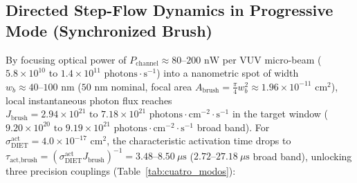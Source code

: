 \documentclass[10pt,twocolumn,a4paper]{article}
\begin{document}
\subsection{Directed Step-Flow Dynamics in Progressive Mode (Synchronized Brush)}
By focusing optical power of $P_{\text{channel}} \approx 80\text{--}200\text{ nW}$ per VUV micro-beam ($5.8 \times 10^{10}$ to $1.4 \times 10^{11}\text{ photons}\cdot\text{s}^{-1}$) into a nanometric spot of width $w_b \approx 40\text{--}100\text{ nm}$ ($50\text{ nm}$ nominal, focal area $A_{\text{brush}} = \frac{\pi}{4}w_b^2 \approx 1.96 \times 10^{-11}\text{ cm}^2$), local instantaneous photon flux reaches $J_{\text{brush}} = 2.94 \times 10^{21}\text{ to }7.18 \times 10^{21}\text{ photons}\cdot\text{cm}^{-2}\cdot\text{s}^{-1}$ in the target window ($9.20 \times 10^{20}\text{ to }9.19 \times 10^{21}\text{ photons}\cdot\text{cm}^{-2}\cdot\text{s}^{-1}$ broad band). For $\sigma_{\text{DIET}}^{\text{act}} = 4.0 \times 10^{-17}\text{ cm}^2$, the characteristic activation time drops to $\tau_{\text{act,brush}} = (\sigma_{\text{DIET}}^{\text{act}} J_{\text{brush}})^{-1} = 3.48\text{--}8.50\ \mu\text{s}$ ($2.72\text{--}27.18\ \mu\text{s}$ broad band), unlocking three precision couplings (Table~\ref{tab:cuatro_modos}):
\end{document}
